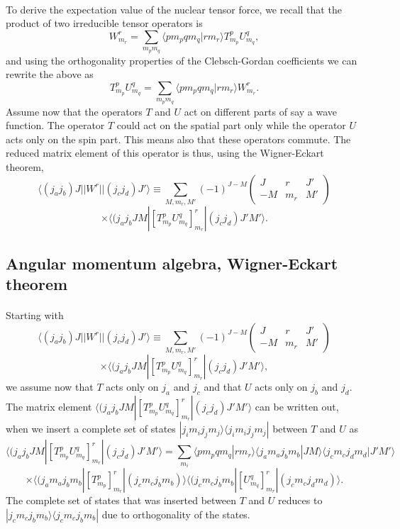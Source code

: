 \documentclass[%
twoside,                 %
final,                   %
10pt]{article}
\begin{document}
\paragraph{}
To derive the expectation value of the nuclear tensor force, we recall that 
the product of two irreducible tensor operators is
\[
W^{r}_{m_r}=\sum_{m_pm_q}\langle pm_pqm_q|rm_r\rangle T^{p}_{m_p}U^{q}_{m_q},
\] 
and using the orthogonality properties of the Clebsch-Gordan coefficients we can rewrite the above as
\[
T^{p}_{m_p}U^{q}_{m_q}=\sum_{m_pm_q}\langle pm_pqm_q|rm_r\rangle W^{r}_{m_r}.
\] 
Assume now that the operators $T$ and $U$ act on different parts of say a wave function. The operator $T$ could act on the spatial part only while the operator $U$ acts only on the spin part. This means also that these operators commute.
The reduced matrix element of this operator is thus, using the Wigner-Eckart theorem,
\[
\langle (j_aj_b)J||W^{r}||(j_cj_d)J'\rangle\equiv\sum_{M,m_r,M'}(-1)^{J-M}\left(\begin{array}{ccc}  J & r & J' \\ -M & m_r & M'\end{array}\right)
\]
\[
\times\langle (j_aj_bJM|\left[ T^{p}_{m_p}U^{q}_{m_q} \right]^{r}_{m_r}|(j_cj_d)J'M'\rangle.
\]



\subsection*{Angular momentum algebra, Wigner-Eckart theorem}

\paragraph{}
Starting with
\[
\langle (j_aj_b)J||W^{r}||(j_cj_d)J'\rangle\equiv\sum_{M,m_r,M'}(-1)^{J-M}\left(\begin{array}{ccc}  J & r & J' \\ -M & m_r & M'\end{array}\right)
\]
\[
\times\langle (j_aj_bJM|\left[ T^{p}_{m_p}U^{q}_{m_q} \right]^{r}_{m_r}|(j_cj_d)J'M'\rangle,
\]
we assume now that $T$ acts only on $j_a$ and $j_c$ and that $U$ acts only on $j_b$ and $j_d$. 
The matrix element $\langle (j_aj_bJM|\left[ T^{p}_{m_p}U^{q}_{m_q} \right]^{r}_{m_r}|(j_cj_d)J'M'\rangle$ can be written out,
when we insert a complete set of states $|j_im_ij_jm_j\rangle\langle j_im_ij_jm_j|$ between $T$ and $U$ as
\[
\langle (j_aj_bJM|\left[ T^{p}_{m_p}U^{q}_{m_q} \right]^{r}_{m_r}|(j_cj_d)J'M'\rangle=\sum_{m_i}\langle pm_pqm_q|rm_r\rangle\langle j_am_aj_bm_b|JM\rangle\langle j_cm_cj_dm_d|J'M'\rangle
\]
\[
\times \langle (j_am_aj_bm_b|\left[ T^{p}_{m_p}\right]^{r}_{m_r}|(j_cm_cj_bm_b)\rangle\langle (j_cm_cj_bm_b|\left[ U^{q}_{m_q}\right]^{r}_{m_r}|(j_cm_cj_dm_d)\rangle.
\]
The complete set of states that was inserted between $T$ and $U$ reduces to $|j_cm_cj_bm_b\rangle\langle j_cm_cj_bm_b|$
due to orthogonality of the states.
\end{document}

